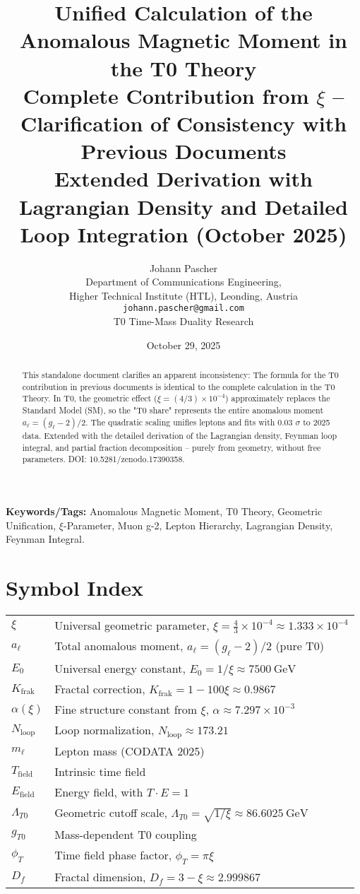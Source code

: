 \documentclass[12pt,a4paper]{article}
\title{\textbf{Unified Calculation of the Anomalous Magnetic Moment in the T0 Theory}\\[0.5cm]
	\large Complete Contribution from $\xi$ – Clarification of Consistency with Previous Documents\\[0.3cm]
	\normalsize Extended Derivation with Lagrangian Density and Detailed Loop Integration (October 2025)}
\author{Johann Pascher\\
	\small Department of Communications Engineering,\\
	\small Higher Technical Institute (HTL), Leonding, Austria\\
	\small \texttt{johann.pascher@gmail.com}\\
	\small T0 Time-Mass Duality Research}
\date{October 29, 2025}
\begin{document}
	
	\maketitle
	\thispagestyle{fancy}
	
	\begin{abstract}
		This standalone document clarifies an apparent inconsistency: The formula for the T0 contribution in previous documents is identical to the complete calculation in the T0 Theory. In T0, the geometric effect ($\xi = (4/3) \times 10^{-4}$) approximately replaces the Standard Model (SM), so the "T0 share" represents the entire anomalous moment $a_\ell = (g_\ell - 2)/2$. The quadratic scaling unifies leptons and fits with 0.03 $\sigma$ to 2025 data. Extended with the detailed derivation of the Lagrangian density, Feynman loop integral, and partial fraction decomposition – purely from geometry, without free parameters. DOI: 10.5281/zenodo.17390358.
	\end{abstract}
	
	\textbf{Keywords/Tags:} Anomalous Magnetic Moment, T0 Theory, Geometric Unification, $\xi$-Parameter, Muon g-2, Lepton Hierarchy, Lagrangian Density, Feynman Integral.
	
	\tableofcontents
	
	\section*{Symbol Index}
	
	\begin{tabular}{ll}
		$\xi$ & Universal geometric parameter, $\xi = \frac{4}{3} \times 10^{-4} \approx 1.333 \times 10^{-4}$ \\
		$a_\ell$ & Total anomalous moment, $a_\ell = (g_\ell - 2)/2$ (pure T0) \\
		$E_0$ & Universal energy constant, $E_0 = 1/\xi \approx \SI{7500}{\giga\electronvolt}$ \\
		$K_\text{frak}$ & Fractal correction, $K_\text{frak} = 1 - 100 \xi \approx 0.9867$ \\
		$\alpha(\xi)$ & Fine structure constant from $\xi$, $\alpha \approx 7.297 \times 10^{-3}$ \\
		$N_\text{loop}$ & Loop normalization, $N_\text{loop} \approx 173.21$ \\
		$m_\ell$ & Lepton mass (CODATA 2025) \\
		$T_\text{field}$ & Intrinsic time field \\
		$E_\text{field}$ & Energy field, with $T \cdot E = 1$ \\
		$\Lambda_{T0}$ & Geometric cutoff scale, $\Lambda_{T0} = \sqrt{1/\xi} \approx \SI{86.6025}{\giga\electronvolt}$ \\
		$g_{T0}$ & Mass-dependent T0 coupling \\
		$\phi_T$ & Time field phase factor, $\phi_T = \pi \xi$ \\
		$D_f$ & Fractal dimension, $D_f = 3 - \xi \approx 2.999867$ \\
	\end{tabular}
	
\end{document}
